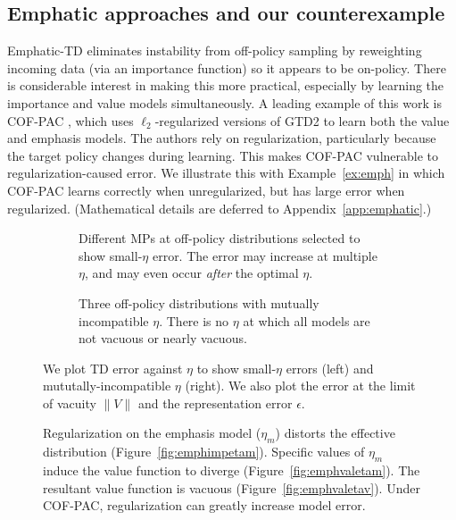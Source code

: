 \subsection{Emphatic approaches and our counterexample}
\label{sec:emphatictd}
Emphatic-TD eliminates instability from off-policy sampling by reweighting incoming data (via an importance function) so it appears to be on-policy. There is considerable interest in making this more practical, especially by learning the importance and value models simultaneously. A leading example of this work is COF-PAC \cite{zhang2020provably}, which uses $\ell_2$-regularized versions of GTD2 \cite{sutton2009fast} to learn both the value and emphasis models. The authors rely on regularization, particularly because the target policy changes during learning. This makes COF-PAC vulnerable to regularization-caused error. We illustrate this with Example~\ref{ex:emph} in which COF-PAC learns correctly when unregularized, but has large error when regularized. (Mathematical details are deferred to Appendix~\ref{app:emphatic}.)


\begin{figure}
  \begin{subfigure}[t]{0.48\textwidth}
    \centering
    
    \vspace{-1.25em}
    \caption{Different MPs at off-policy distributions selected to show small-$\eta$ error. The error may increase at multiple $\eta$, and may even occur \emph{after} the optimal $\eta$. }
    \label{fig:etagraph}
  \end{subfigure}
  \hfill
  \begin{subfigure}[t]{0.48\textwidth}
    \centering
    
    \caption{Three off-policy distributions with mutually incompatible $\eta$. There is no $\eta$ at which all models are not vacuous or nearly vacuous. }
    \label{fig:mismatchedeta}
  \end{subfigure}
  \caption{We plot TD error against $\eta$ to show small-$\eta$ errors (left) and mututally-incompatible $\eta$ (right). We also plot the error at the limit of vacuity $\|V\|$ and the representation error $\epsilon$. }
\end{figure}

\begin{figure}
  
  \label{fig:emphasisplotseta}
  \caption{Regularization on the emphasis model ($\eta_m$) distorts the effective distribution (Figure~\ref{fig:emphimpetam}). Specific values of $\eta_m$ induce the value function to diverge (Figure~\ref{fig:emphvaletam}). The resultant value function is vacuous (Figure~\ref{fig:emphvaletav}). Under COF-PAC, regularization can greatly increase model error. }
\end{figure}



